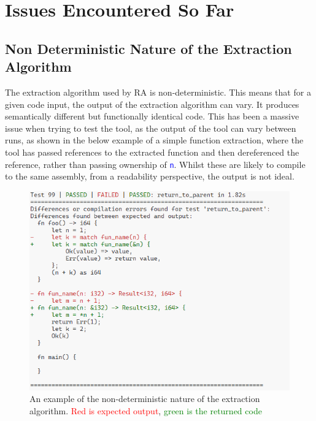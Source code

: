 \section{Issues Encountered So Far}

\subsection{Non Deterministic Nature of the Extraction Algorithm}

The extraction algorithm used by RA is non-deterministic. This means that for a
given code input, the output of the extraction algorithm can vary. It produces
semantically different but functionally identical code. This has been a massive
issue when trying to test the tool, as the output of the tool can vary between
runs, as shown in the below example of a simple function extraction, where the
tool has passed references to the extracted function and then dereferenced the
reference, rather than passing ownership of \textcolor{blue}{\texttt{n}}. Whilst
these are likely to compile to the same assembly, from a readability
perspective, the output is not ideal.

\begin{figure}[H]
    \centering
    \includegraphics[width=\columnwidth]{Figures/issue_1.png}
    \caption{An example of the non-deterministic nature of the extraction
    algorithm. \textcolor{red}{Red is expected output}, \textcolor{green}{green is the
    returned code}}
    \label{fig:issue1}
\end{figure}